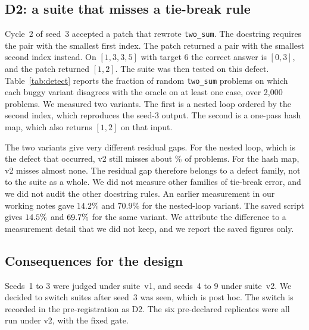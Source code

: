 \documentclass[11pt]{article}
\begin{document}
\subsection{D2: a suite that misses a tie-break rule}

Cycle~2 of seed~3 accepted a patch that rewrote \texttt{two\_sum}. The docstring requires the pair with the smallest first index. The patch returned a pair with the smallest second index instead. On $[1,3,3,5]$ with target $6$ the correct answer is $[0,3]$, and the patch returned $[1,2]$.
The suite was then tested on this defect. Table~\ref{tab:detect} reports the fraction of random \texttt{two\_sum} problems on which each buggy variant disagrees with the oracle on at least one case, over 2{,}000 problems. We measured two variants. The first is a nested loop ordered by the second index, which reproduces the seed-3 output. The second is a one-pass hash map, which also returns $[1,2]$ on that input.

\begin{table}[t]
\centering\small
\caption{Share of \texttt{two\_sum} problems on which a buggy solution is caught, by suite (2{,}000 problems each; \texttt{results/study3/suite\_detection.py}). Suite v1 has 6 cases per problem. Suite v2 has 12 generated cases plus 12 targeted tie-break cases for \texttt{two\_sum}, so 24 cases in all.}
\label{tab:detect}

\end{table}

The two variants give very different residual gaps. For the nested loop, which is the defect that occurred, v2 still misses about \ThrMissLoopVtwo\% of problems. For the hash map, v2 misses almost none. The residual gap therefore belongs to a defect family, not to the suite as a whole. We did not measure other families of tie-break error, and we did not audit the other docstring rules.
An earlier measurement in our working notes gave $14.2\%$ and $70.9\%$ for the nested-loop variant. The saved script gives $14.5\%$ and $69.7\%$ for the same variant. We attribute the difference to a measurement detail that we did not keep, and we report the saved figures only.

\subsection{Consequences for the design}

Seeds~1 to 3 were judged under suite~v1, and seeds~4 to 9 under suite~v2. We decided to switch suites after seed~3 was seen, which is post hoc. The switch is recorded in the pre-registration as D2. The six pre-declared replicates were all run under v2, with the fixed gate.
\end{document}
